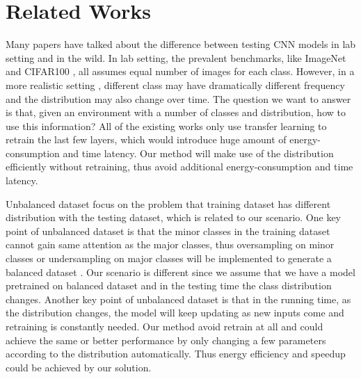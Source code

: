 \documentclass{article}
\begin{document}
\section{Related Works}
{\color{blue}
Many papers have talked about the difference between testing CNN models in lab setting and in the wild. In lab setting, the prevalent benchmarks, like ImageNet \cite{deng2009imagenet} and CIFAR100 \cite{krizhevsky2009learning}, all assumes equal number of images for each class. However, in a more realistic setting \cite{han2016mcdnn, shen2017fast}, different class may have dramatically different frequency and the distribution may also change over time. The question we want to answer is that, given an environment with a number of classes and distribution, how to use this information? All of the existing works \cite{han2016mcdnn, shen2017fast} only use transfer learning to retrain the last few layers, which would introduce huge amount of energy-consumption and time latency. Our method will make use of the distribution efficiently without retraining, thus avoid additional energy-consumption and time latency.

Unbalanced dataset focus on the problem that training dataset has different distribution with the testing dataset, which is related to our scenario. One key point of unbalanced dataset is that the minor classes in the training dataset cannot gain same attention as the major classes, thus oversampling on minor classes or undersampling on major classes will be implemented to generate a balanced dataset \cite{wang2016dealing}. Our scenario is different since we assume that we have a model pretrained on balanced dataset and in the testing time the class distribution changes. Another key point of unbalanced dataset is that in the running time, as the distribution changes, the model will keep updating as new inputs come and retraining is constantly needed. Our method avoid retrain at all and could achieve the same or better performance by only changing a few parameters according to the distribution automatically. Thus energy efficiency and speedup could be achieved by our solution.


}
\end{document}
